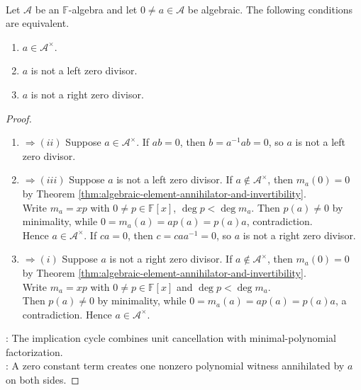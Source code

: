 \begin{theorem} \label{thm:algebraic-invertible-iff-not-zero-divisor} \\
Let $\mathcal{A}$ be an $\mathbb{F}$-algebra and let $0\neq a\in\mathcal{A}$ be algebraic. The following conditions are equivalent.
\begin{enumerate}[label=(\roman*)]
\setlength{\itemsep}{0pt}
\item $a\in\mathcal{A}^{\times}$.
\item $a$ is not a left zero divisor.
\item $a$ is not a right zero divisor.
\end{enumerate}
\begin{proof}
\begin{enumerate}[label=(\roman*)]
\setlength{\itemsep}{0pt}
\item[$(i)$] $\Rightarrow (ii)$ Suppose $a\in\mathcal{A}^{\times}$. If $ab=0$, then $b=a^{-1}ab=0$, so $a$ is not a left zero divisor.
\item[$(ii)$] $\Rightarrow (iii)$ Suppose $a$ is not a left zero divisor. If $a\notin\mathcal{A}^{\times}$, then $m_a(0)=0$ by Theorem \ref{thm:algebraic-element-annihilator-and-invertibility}.\\
Write $m_a=xp$ with $0\neq p\in\mathbb{F}[x]$, $\deg p<\deg m_a$. Then $p(a)\neq0$ by minimality, while $0=m_a(a)=ap(a)=p(a)a$, contradiction.\\
Hence $a\in\mathcal{A}^{\times}$. If $ca=0$, then $c=caa^{-1}=0$, so $a$ is not a right zero divisor.
\item[$(iii)$] $\Rightarrow (i)$ Suppose $a$ is not a right zero divisor. If $a\notin\mathcal{A}^{\times}$, then $m_a(0)=0$ by Theorem \ref{thm:algebraic-element-annihilator-and-invertibility}.\\
Write $m_a=xp$ with $0\neq p\in\mathbb{F}[x]$ and $\deg p<\deg m_a$.\\
Then $p(a)\neq0$ by minimality, while $0=m_a(a)=ap(a)=p(a)a$, a contradiction. Hence $a\in\mathcal{A}^{\times}$.
\end{enumerate}
: The implication cycle combines unit cancellation with minimal-polynomial factorization.\\
: A zero constant term creates one nonzero polynomial witness annihilated by $a$ on both sides.
\end{proof}
\end{theorem}

